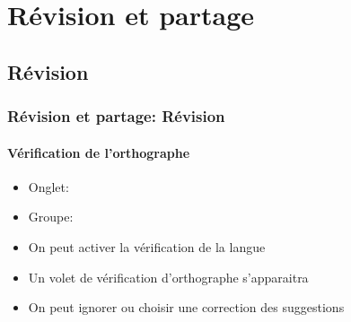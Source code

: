 \documentclass[xcolor=table]{beamer}
\begin{document}
\section{Révision et partage}

%

\subsection{Révision}

\begin{frame}[t]
\frametitle{Révision et partage: Révision}
\framesubtitle{Vérification de l'orthographe}

\begin{minipage}{0.74\textwidth}
	\begin{itemize}
		\item Onglet: 
		\item Groupe: 
		\item On peut activer la vérification de la langue 
		\item Un volet de vérification d'orthographe s'apparaitra
		\item On peut ignorer ou choisir une correction des suggestions
	\end{itemize}
\end{minipage}
\begin{minipage}{0.25\textwidth}
	\begin{flushright}
	\end{flushright}
	
	\vspace{-12pt}
	
	
\end{minipage}

\end{frame}
\end{document}
